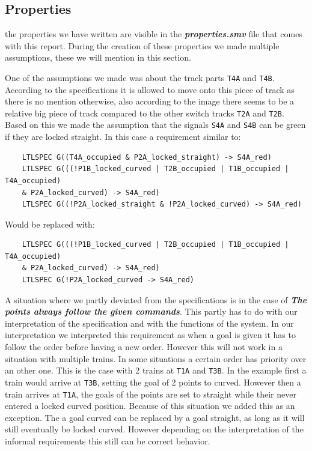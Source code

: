 \documentclass[a4paper]{article}
\begin{document}
	\subsection{Properties}
	the properties we have written are visible in the \textit{\textbf{properties.smv}} file that comes with this report.
	During the creation of these properties we made multiple assumptions, these we will mention in this section.
	
	One of the assumptions we made was about the track parts \texttt{T4A} and \texttt{T4B}. According to the specifications it is allowed to move onto this piece of track as there is no mention otherwise, also according to the image there seems to be a relative big piece of track compared to the other switch tracks \texttt{T2A} and \texttt{T2B}. Based on this we made the assumption that the signals \texttt{S4A} and \texttt{S4B} can be green if they are locked straight. In this case a requirement similar to:
	\begin{lstlisting}
	LTLSPEC G((T4A_occupied & P2A_locked_straight) -> S4A_red)
	LTLSPEC G(((!P1B_locked_curved | T2B_occupied | T1B_occupied | T4A_occupied) 
	& P2A_locked_curved) -> S4A_red)
	LTLSPEC G((!P2A_locked_straight & !P2A_locked_curved) -> S4A_red)
	\end{lstlisting}
	Would be replaced with:
	\begin{lstlisting}
	LTLSPEC G(((!P1B_locked_curved | T2B_occupied | T1B_occupied | T4A_occupied) 
	& P2A_locked_curved) -> S4A_red)
	LTLSPEC G(!P2A_locked_curved -> S4A_red)
	\end{lstlisting}
	
	A situation where we partly deviated from the specifications is in the case of \textit{\textbf{The points always follow the given commands}}. This partly has to do with our interpretation of the specification and with the functions of the system. In our interpretation we interpreted this requirement as when a goal is given it has to follow the order before having a new order. However this will not work in a situation with multiple trains. In some situations a certain order has priority over an other one. This is the case with 2 trains at \texttt{T1A} and \texttt{T3B}. In the example first a train would arrive at \texttt{T3B}, setting the goal of 2 points to curved. However then a train arrives at \texttt{T1A}, the goals of the points are set to straight while their never entered a locked curved position.
	Because of this situation we added this as an exception. The a goal curved can be replaced by a goal straight, as long as it will still eventually be locked curved. However depending on the interpretation of the informal requirements this still can be correct behavior.
	
\end{document}
